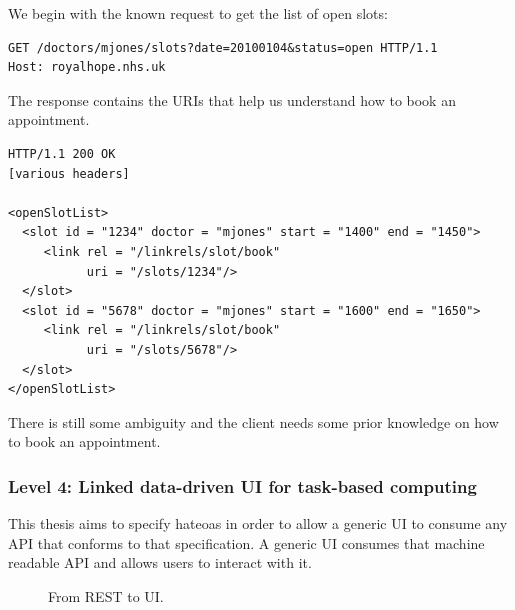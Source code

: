 We begin with the known request to get the list of open slots:

\lstset{language=}
\begin{lstlisting}[caption=Fetching the list of open slots.]
GET /doctors/mjones/slots?date=20100104&status=open HTTP/1.1
Host: royalhope.nhs.uk
\end{lstlisting}

The response contains the URIs that help us understand how to book an appointment.

\lstset{language=}
\begin{lstlisting}[caption=Level 3: The response contains information that helps us book an appointment.]
HTTP/1.1 200 OK
[various headers]

<openSlotList>
  <slot id = "1234" doctor = "mjones" start = "1400" end = "1450">
     <link rel = "/linkrels/slot/book"
           uri = "/slots/1234"/>
  </slot>
  <slot id = "5678" doctor = "mjones" start = "1600" end = "1650">
     <link rel = "/linkrels/slot/book"
           uri = "/slots/5678"/>
  </slot>
</openSlotList>
\end{lstlisting}

There is still some ambiguity and the client needs some prior knowledge on how to book an appointment.

\subsubsection{Level 4: Linked data-driven UI for task-based computing}
This thesis aims to specify \gls{hateoas} in order to allow a generic UI to consume any API that conforms to that specification. A generic UI consumes that machine readable API and allows users to interact with it.

\begin{figure}[!htb]
  \caption{From REST to UI.}
\end{figure}

